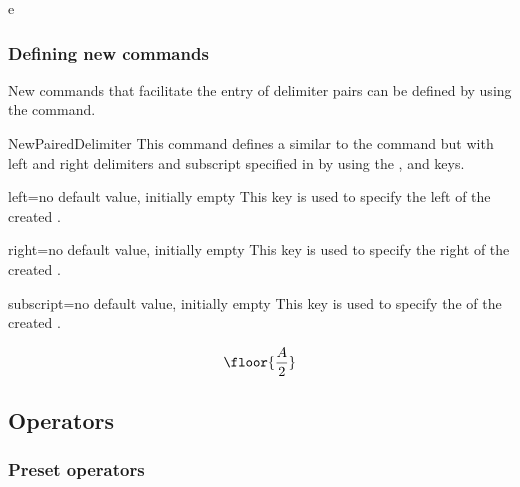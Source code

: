 \documentclass[english,nolocaltoc]{nwejmart}
\newtheorem[style=definition]{fact}
\newtheorem[title-plural=Criteria]{criterion}
\newtheorem[title=random experiment]{rexp}
\begin{document}
e\subsubsection{Defining new commands}

New commands that facilitate the entry of delimiter pairs can be
defined by using the   command.
%
\begin{docCommand}{NewPairedDelimiter}{}
  This command defines a  similar to the
   command  but with left and right delimiters and
  subscript specified in  by using  the ,
   and  keys.
  \begin{docKey}{left}{=}{no default value, initially empty}
    This key is used to  specify the left  of the created .
  \end{docKey}
  \begin{docKey}{right}{=}{no default value, initially empty}
    This key is used to  specify the right  of the created .
  \end{docKey}
  \begin{docKey}{subscript}{=}{no default value, initially empty}
     This key is used to  specify the  of the
     created .
  \end{docKey}
\end{docCommand}

\begin{preamblecode}[listing options={morekeywords={[2]left,right,subscript}}]
\end{preamblecode}
\begin{bodycode}
\begin{equation}
\floor{\frac{A}{2}}
\end{equation}
\end{bodycode}

\subsection{Operators}

\subsubsection{Preset operators}
\end{document}
